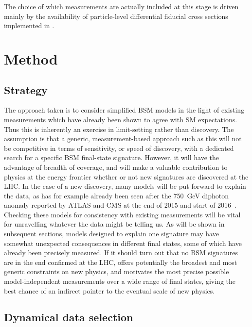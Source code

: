 \documentclass[floatfix]{article}
\begin{document}
The choice of which measurements are actually included at this stage is driven mainly by the availability of particle-level differential 
fiducial cross sections 
implemented in \rivet. 

\section{Method}
\label{sec:method}

\subsection{Strategy}

The approach taken is to consider simplified BSM models in the light of existing measurements which have already been shown to agree with SM expectations.
Thus this is inherently an exercise in limit-setting rather than discovery. The assumption is that a generic, measurement-based approach such as this will not be
competitive in terms of sensitivity, or speed of discovery, with a dedicated search for a specific BSM final-state signature. However, it will have the
advantage of breadth of coverage, and will make a valuable contribution to physics at the energy frontier whether or not new signatures are discovered at the LHC.
In the case of a new discovery, many models will be put forward to explain the data, as has for example already been seen\cite{PhysRevLett.116.150001} 
after the 750~GeV diphoton anomaly 
reported by ATLAS and CMS at the end of 2015 and start of 2016~\cite{ATLAS-CONF-2016-018,CMS-PAS-EXO-16-018}. 
Checking these models for consistency with existing measurements will be vital for unravelling whatever 
the data might be telling us. As will be shown in subsequent sections, models designed to explain one signature may have somewhat unexpected consequences 
in different final states, some of which have already been precisely measured. If it should turn out that no BSM signatures are in the end confirmed at the LHC,
\Contur offers potentially the broadest and most generic constraints on new physics, and motivates the most precise possible model-independent measurements
over a wide range of final states, giving the best chance of an indirect pointer to the eventual scale of new physics.

\subsection{Dynamical data selection}\label{sec:dynselec}
\label{sec:selec}
\end{document}

